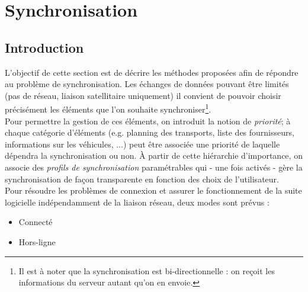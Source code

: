 \section{Synchronisation}

\label{SynchronisationTechnique}

% 

\subsection{Introduction}
L'objectif de cette section est de décrire les méthodes proposées afin de répondre au problème de synchronisation. Les échanges de données pouvant être limités (pas de réseau, liaison satellitaire uniquement) il convient de pouvoir choisir précisément les éléments que l'on souhaite synchroniser\footnote{Il est à noter que la synchronisation est bi-directionnelle : on reçoit les informations du serveur autant qu'on en envoie.}.\\
Pour permettre la gestion de ces éléments, on introduit la notion de \emph{priorité}; à chaque catégorie d'éléments (e.g. planning des transports, liste des fournisseurs, informations sur les véhicules, ...) peut être associée une priorité de laquelle dépendra la synchronisation ou non. À partir de cette \og{}hiérarchie d'importance\fg{}, on associe des \emph{profils de synchronisation} paramétrables qui - une fois activés - gère la synchronisation de façon transparente en fonction des choix de l'utilisateur.\\
Pour résoudre les problèmes de connexion et assurer le fonctionnement de la suite logicielle indépendamment de la liaison réseau, deux modes sont prévus :
\begin{itemize}
    \item Connecté
    \item Hors-ligne
\end{itemize}
